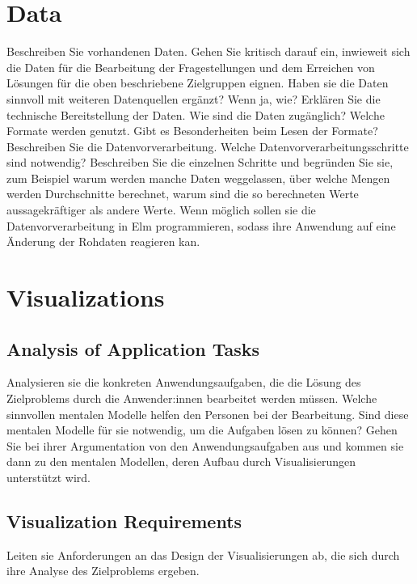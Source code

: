 \documentclass[usegeometry=true]{scrartcl}
\begin{document}
\section{Data}
Beschreiben Sie vorhandenen Daten. Gehen Sie kritisch darauf ein, inwieweit sich die Daten für die Bearbeitung der Fragestellungen und dem Erreichen von Lösungen für die oben beschriebene Zielgruppen eignen. Haben sie die Daten sinnvoll mit weiteren Datenquellen ergänzt? Wenn ja, wie?
Erklären Sie die technische Bereitstellung der Daten.
Wie sind die Daten zugänglich? Welche Formate werden genutzt. Gibt es Besonderheiten beim Lesen der Formate?
Beschreiben Sie die Datenvorverarbeitung.
Welche Datenvorverarbeitungsschritte sind notwendig? Beschreiben Sie die einzelnen Schritte und begründen Sie sie, zum Beispiel warum werden manche Daten weggelassen, über welche Mengen werden Durchschnitte berechnet, warum sind die so berechneten Werte aussagekräftiger als andere Werte. Wenn möglich sollen sie die Datenvorverarbeitung in Elm programmieren, sodass ihre Anwendung auf eine Änderung der Rohdaten reagieren kan.

\section{Visualizations}
\subsection{Analysis of Application Tasks}
Analysieren sie die konkreten Anwendungsaufgaben, die die Lösung des Zielproblems durch die Anwender:innen bearbeitet werden müssen. 
Welche sinnvollen mentalen Modelle helfen den Personen bei der Bearbeitung.
Sind diese mentalen Modelle für sie notwendig, um die Aufgaben lösen zu können? Gehen Sie bei ihrer Argumentation von den Anwendungsaufgaben aus und kommen sie dann zu den mentalen Modellen, deren Aufbau durch Visualisierungen unterstützt wird.
\subsection{Visualization Requirements}
Leiten sie Anforderungen an das Design der Visualisierungen ab, die sich durch ihre Analyse des Zielproblems ergeben.
\end{document}
